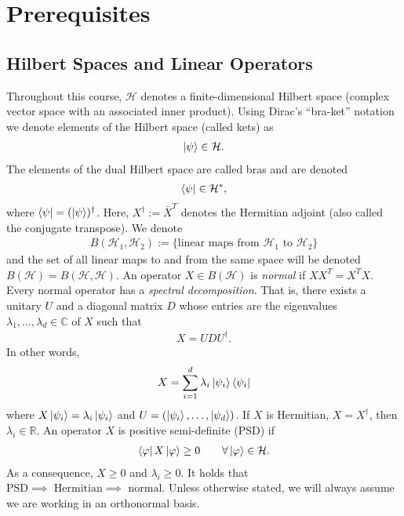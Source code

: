 \documentclass[../../note.tex]{subfiles}
\begin{document}
\chapter{Prerequisites}
\section{Hilbert Spaces and Linear Operators}
Throughout this course, $\mathcal{H}$ denotes a finite-dimensional Hilbert space (complex vector space with an associated inner product). Using Dirac's ``bra-ket'' notation we denote elements of the Hilbert space (called kets) as
\begin{align}
    \ket{\psi}\in \mathcal{H}.
\end{align}
The elements of the dual Hilbert space are called bras and are denoted
\begin{align}
    \bra{\psi}\in \mathcal{H}^*,
\end{align}
where $\bra{\psi}=(\ket{\psi})^{\dagger}$. Here, $X^{\dagger}:=\bar{X}^{T}$ denotes the Hermitian adjoint (also called the conjugate transpose). We denote
\begin{align}
    B(\mathcal{H}_1,\mathcal{H}_2) := \{\text{linear maps from $\mathcal{H}_1$ to $\mathcal{H}_2$}\}
\end{align} 
and the set of all linear maps to and from the same space will be denoted $B(\mathcal{H})=B(\mathcal{H},\mathcal{H})$. An operator $X \in B(\mathcal{H})$ is \textit{normal} if $XX^{T}=X^{T}X$. Every normal operator has a \textit{spectral decomposition}. That is, there exists a unitary $U$ and a diagonal matrix $D$ whose entries are the eigenvalues $\lambda_1,\dots,\lambda_d \in \mathbb{C}$ of $X$ such that 
\begin{align}
    X=UDU^{\dagger}.
\end{align}
In other words, 
\begin{align}
    X=\sum_{i=1}^d\lambda_i \ket{\psi_i} \bra{\psi_i}
\end{align}
where $X\ket{\psi_i}=\lambda_i \ket{\psi_i}$ and $U=(\ket{\psi_i},\dots,\ket{\psi_d})$. If $X$ is Hermitian, $X=X^{\dagger}$, then $\lambda_i \in \mathbb{R}$. An operator $X$ is positive semi-definite (PSD) if \begin{align}
    \bra{\varphi} X \ket{\varphi} \geq 0 \quad \quad \forall \ket{\varphi} \in \mathcal{H}.
\end{align}
As a consequence, $X \geq 0$ and $\lambda_i \geq 0$.
It holds that $\text{PSD} \implies \text{ Hermitian} \implies \text{ normal}$. Unless otherwise stated, we will always assume we are working in an orthonormal basis.
\end{document}
